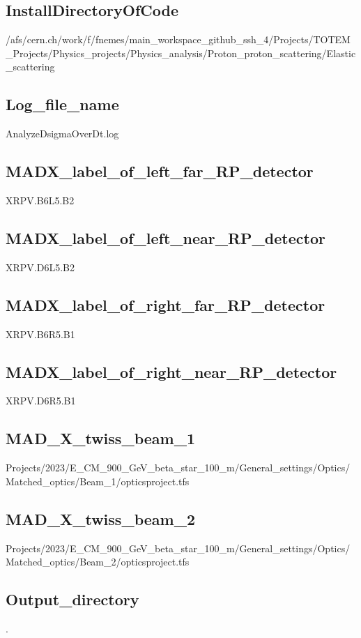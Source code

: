\documentclass{article}
\begin{document}
\begin{landscape}
\subsection{InstallDirectoryOfCode}
/afs/cern.ch/work/f/fnemes/main\_workspace\_github\_ssh\_4/Projects/TOTEM\_Projects/Physics\_projects/Physics\_analysis/Proton\_proton\_scattering/Elastic\_scattering \newline
\subsection{Log\_file\_name}
AnalyzeDsigmaOverDt.log \newline
\subsection{MADX\_label\_of\_left\_far\_RP\_detector}
XRPV.B6L5.B2 \newline
\subsection{MADX\_label\_of\_left\_near\_RP\_detector}
XRPV.D6L5.B2 \newline
\subsection{MADX\_label\_of\_right\_far\_RP\_detector}
XRPV.B6R5.B1 \newline
\subsection{MADX\_label\_of\_right\_near\_RP\_detector}
XRPV.D6R5.B1 \newline
\subsection{MAD\_X\_twiss\_beam\_1}
Projects/2023/E\_CM\_900\_GeV\_beta\_star\_100\_m/General\_settings/Optics/Matched\_optics/Beam\_1/opticsproject.tfs \newline
\subsection{MAD\_X\_twiss\_beam\_2}
Projects/2023/E\_CM\_900\_GeV\_beta\_star\_100\_m/General\_settings/Optics/Matched\_optics/Beam\_2/opticsproject.tfs \newline
\subsection{Output\_directory}
. \newline

\end{landscape}
\end{document}
